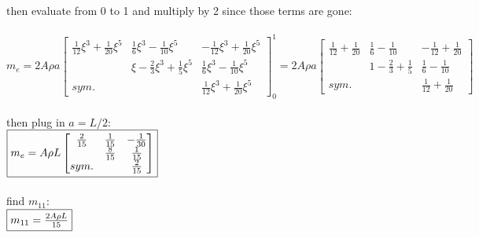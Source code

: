 \documentclass{article}
\begin{document}
then evaluate from 0 to 1 and multiply by 2 since those terms are gone: \\\\
$m_e=2A\rho a\begin{bmatrix}
    \frac{1}{12}\xi^3+\frac{1}{20}\xi^5 & \frac{1}{6}\xi^3-\frac{1}{10}\xi^5 &
    -\frac{1}{12}\xi^3+\frac{1}{20}\xi^5 \\
    & \xi-\frac{2}{3}\xi^3+\frac{1}{5}\xi^5 & \frac{1}{6}\xi^3-\frac{1}{10}\xi^5 \\
    sym. & & \frac{1}{12}\xi^3+\frac{1}{20}\xi^5
\end{bmatrix}_{0}^1=2A\rho a\begin{bmatrix}
    \frac{1}{12}+\frac{1}{20} & \frac{1}{6}-\frac{1}{10} & -\frac{1}{12}+\frac{1}{20} \\
    & 1-\frac{2}{3}+\frac{1}{5} & \frac{1}{6}-\frac{1}{10} \\
    sym. & & \frac{1}{12}+\frac{1}{20}
\end{bmatrix}$ \\\\
then plug in $a=L/2$: \\
$\fbox{$m_e=A\rho L\begin{bmatrix}
    \frac{2}{15} & \frac{1}{15} & -\frac{1}{30} \\
    & \frac{8}{15} & \frac{1}{15} \\
    sym. & & \frac{2}{15}
\end{bmatrix}$}$ \\\\
find $m_{11}$: \\
$\fbox{$m_{11}=\frac{2A\rho L}{15}$}$
\end{document}
